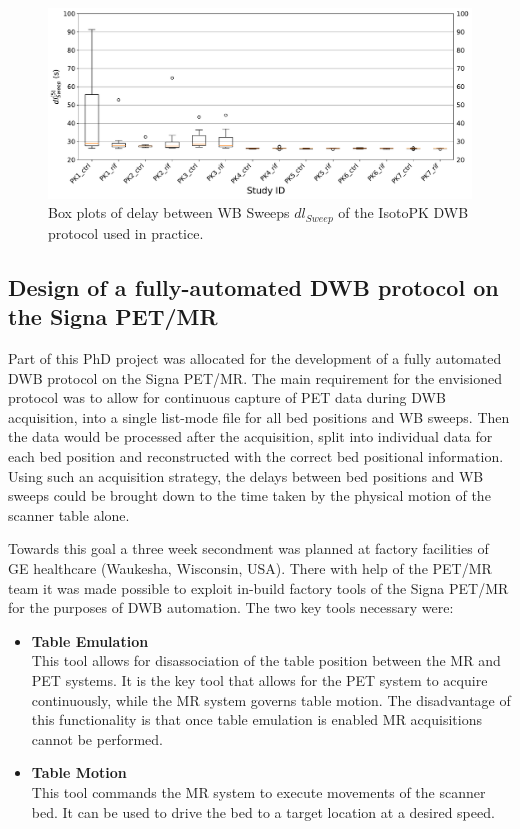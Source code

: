 %
\begin{figure} [ht!]
\centering
\includegraphics[scale=0.5,angle=0]{3_Results/3_1_DWB_Optimization/figures/3_1_BoxPlots_DTSweeps.pdf}
\caption{Box plots of delay between WB Sweeps $dl_{Sweep}$ of the IsotoPK DWB protocol used in practice.}
\label{fig3_1:BoxPlots_sweeps}
\end{figure}
%
%
%
\subsection{Design of a fully-automated DWB protocol on the Signa PET/MR}
Part of this PhD project was allocated for the development of a fully automated DWB protocol on the Signa PET/MR. 
The main requirement for the envisioned protocol was to allow for continuous capture of PET data during DWB acquisition, into a single list-mode file for all bed positions and WB sweeps. Then the data would be processed after the acquisition, split into individual data for each bed position and reconstructed with the correct bed positional information. Using such an acquisition strategy, the delays between bed positions and WB sweeps could be brought down to the time taken by the physical motion of the scanner table alone. 

Towards this goal a three week secondment was planned at factory facilities of GE healthcare (Waukesha, Wisconsin, USA). %
There with help of the PET/MR team it was made possible to exploit in-build factory tools of the Signa PET/MR for the purposes of DWB automation. The two key tools necessary were: 
\begin{itemize}
    \item\textbf{Table Emulation} \\
    This tool allows for disassociation of the table position between the MR and PET systems. It is the key tool that allows for the PET system to acquire continuously, while the MR system governs table motion. The disadvantage of this functionality is that once table emulation is enabled MR acquisitions cannot be performed.%
    \item\textbf{Table Motion} \\
    This tool commands the MR system to execute movements of the scanner bed. It can be used to drive the bed to a target location at a desired speed. 
\end{itemize}


